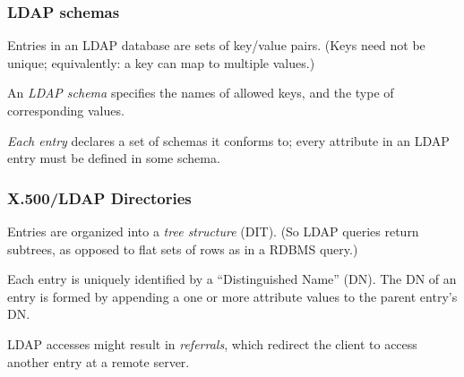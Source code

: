 \documentclass[english,serif,mathserif,usenames,dvipsnames]{beamer}
\begin{document}
\appendix

\begin{frame}
  \frametitle{LDAP schemas}
  Entries in an LDAP database are sets of key/value pairs. (Keys need
  not be unique; equivalently: a key can map to multiple values.)

  \+
  An \emph{LDAP schema} specifies the names of allowed keys, and the type of
  corresponding values.

  \+
  \emph{Each entry} declares a set of schemas it conforms to; every
  attribute in an LDAP entry must be defined in some schema.
\end{frame}


\begin{frame}
  \frametitle{X.500/LDAP Directories}

  Entries are organized into a \emph{tree structure} (DIT).
  (So LDAP queries return subtrees, as opposed to flat sets of rows as
  in a RDBMS query.)

  \+
  Each entry is uniquely identified by a ``Distinguished Name'' (DN).
  The DN of an entry is formed by appending a one or more attribute
  values to the parent entry's DN.

  \+
  LDAP accesses might result in \emph{referrals}, which redirect the
  client to access another entry at a remote server.
\end{frame}
\end{document}
